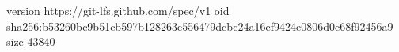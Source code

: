 version https://git-lfs.github.com/spec/v1
oid sha256:b53260bc9b51cb597b128263e556479dcbc24a16ef9424e0806d0c68f92456a9
size 43840
